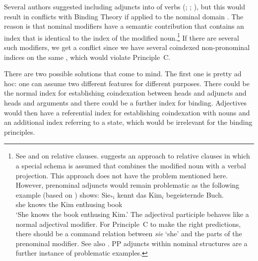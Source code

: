 \documentclass[output=paper,biblatex,babelshorthands,newtxmath,draftmode,colorlinks,citecolor=brown]{langscibook}
\begin{document}
Several authors suggested including adjuncts into \argstls of verbs
(\citealp[]{Chung98}; \citealp[]{Prze99}; \citealp*[]{MSI99a}), but this would
result in conflicts with Binding Theory if applied to the nominal domain \citep[Section~20.4.1.]{Mueller99a}. The reason is that nominal modifiers have a semantic contribution that
contains an index that is identical to the index of the modified noun.\footnote{%
See  and
 on relative clauses. \citet{Sag97a} suggests an approach to relative clauses in
which a special schema is assumed that combines the modified noun with a verbal projection. This
approach does not have the problem mentioned here. However, prenominal adjuncts would remain
problematic as the following example (based on \citealt[]{Mueller99a}) shows:
\ea
\gll Sie$_{*i}$ kennt das Kim$_i$ begeisternde Buch.\\
     she        knows the Kim     enthusing    book\\
\glt `She knows the book enthusing Kim.'
\z
The adjectival participle behaves like a normal adjectival modifier. For Principle~C to make the
right predictions, there should be a command relation between \emph{sie} `she' and the parts of the
prenominal modifier. See also
\crossrefchapterw[\pageref{relative-clauses:fn-page-to-be-read}]{relative-clauses}. PP adjuncts
within nominal structures are a further instance of problematic examples.%
} If there are several such modifiers, we get a conflict since we have several coindexed non-pronominal indices on the same
\argstl, which would violate Principle~C. 

There are two possible solutions that come to mind. The first one is pretty ad
hoc: one can assume two different features for different purposes. There could be the normal index
for establishing coindexation between heads and adjuncts and heads and arguments and there could be
a further index for binding. Adjectives would then have a referential index for establishing
coindexation with nouns and an additional index referring to a state, which would be irrelevant for the
binding principles.
\end{document}
